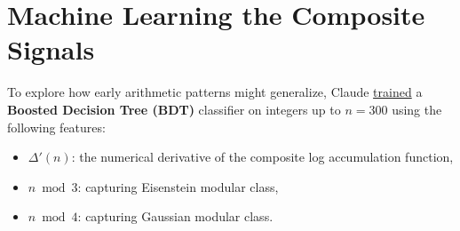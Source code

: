 % 
% 
% 
% 
\section*{Machine Learning the Composite Signals}

To explore how early arithmetic patterns might generalize, Claude \href{https://colab.research.google.com/drive/1kNbqnV0W_gIFTbSCFUpgpWQTHq2MpWZ2?usp=sharing}{trained} a \textbf{Boosted Decision Tree (BDT)} classifier on integers up to $n = 300$ using the following features:
\begin{itemize}
  \item $\Delta'(n)$: the numerical derivative of the composite log accumulation function,
  \item $n \bmod 3$: capturing Eisenstein modular class,
  \item $n \bmod 4$: capturing Gaussian modular class.
\end{itemize}

